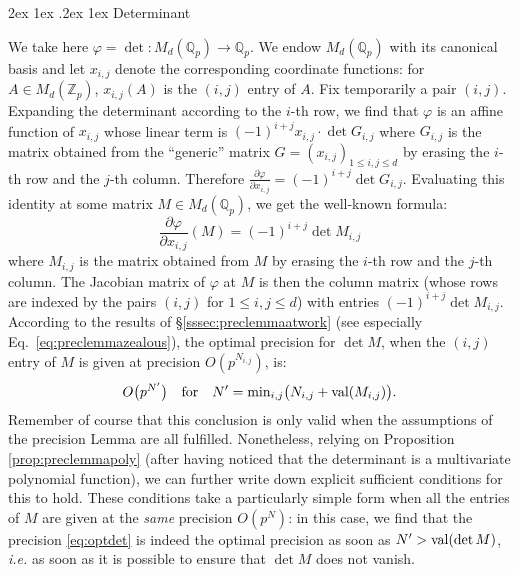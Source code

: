 \documentclass[11pt]{article}
\makeatletter
\numberwithin{equation}{section}
\numberwithin{figure}{section}
\renewcommand\paragraph{\@startsection{paragraph}{4}{\z@}%
                                    {2ex \@plus1ex \@minus.2ex}%
                                    {1ex}%
                                    {\normalfont\normalsize\bfseries}}
\renewcommand{\leq}{\leqslant}
\theoremstyle{definition}
\newcommand{\Z}{\mathbb Z}
\newcommand{\Zp}{\Z_p}
\newcommand{\Q}{\mathbb Q}
\newcommand{\Qp}{\Q_p}
\renewcommand{\min}{\text{\rm min}}
\newcommand{\val}{\text{\rm val}}
\makeatother
\begin{document}
\paragraph{Determinant}

We take here $\varphi = \det : M_d(\Qp) \to \Qp$. We endow $M_d(\Qp)$ 
with its canonical basis and let $x_{i,j}$ denote the corresponding 
coordinate functions: for $A \in M_d(\Zp)$, $x_{i,j}(A)$ is the $(i,j)$ 
entry of $A$.
Fix temporarily a pair $(i,j)$. Expanding the determinant according 
to the $i$-th row, we find that $\varphi$ is an affine function of
$x_{i,j}$ whose linear term is $(-1)^{i+j} x_{i,j} \cdot \det G_{i,j}$
where $G_{i,j}$ is the matrix obtained from the ``generic'' matrix
$G = (x_{i,j})_{1 \leq i,j \leq d}$ by erasing the $i$-th row and the 
$j$-th column. Therefore
$\frac{\partial \varphi}{\partial x_{i,j}} = (-1)^{i+j} \det G_{i,j}$.
Evaluating this identity at some matrix $M \in M_d(\Qp)$, we get
the well-known formula:
\begin{equation}
\label{eq:partialdet}
\frac{\partial \varphi}{\partial x_{i,j}}(M) = (-1)^{i+j} \det M_{i,j}
\end{equation}
where $M_{i,j}$ is the matrix obtained from $M$ by erasing the $i$-th
row and the $j$-th column. The Jacobian matrix of $\varphi$ at $M$ is 
then the column matrix (whose rows are indexed by the pairs $(i,j)$
for $1 \leq i,j \leq d$) with entries $(-1)^{i+j} \det M_{i,j}$.
According to the results of \S \ref{sssec:preclemmaatwork} (see 
especially Eq.~\eqref{eq:preclemmazealous}), the optimal precision
for $\det M$, when the $(i,j)$ entry of $M$ is given at precision
$O(p^{N_{i,j}})$, is:
\begin{equation}
\label{eq:optdet}
O\big(p^{N'}\big) \quad \text{for} \quad
N' = \min_{i,j} \big( N_{i,j} + \val(M_{i,j})\big).
\end{equation}
Remember of course that this conclusion is only valid when the
assumptions of the precision Lemma are all fulfilled. Nonetheless,
relying on Proposition \ref{prop:preclemmapoly} (after having noticed that the 
determinant is a multivariate polynomial function), we can further 
write down explicit sufficient conditions for this to hold. These
conditions take a particularly simple form when all the entries of
$M$ are given at the \emph{same} precision $O(p^N)$: in this case,
we find that the precision \eqref{eq:optdet} is indeed the optimal
precision as soon as $N' > \val(\det M)$, \emph{i.e.} as soon as it 
is possible to ensure that $\det M$ does not vanish.
\end{document}
